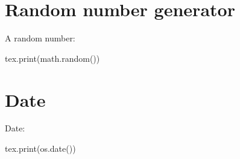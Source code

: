 \documentclass{article}
\begin{document}
\section*{Random number generator}

A random number:
\begin{luacode}
tex.print(math.random())
\end{luacode}

\section*{Date}

Date:
\begin{luacode}
tex.print(os.date())
\end{luacode}
\end{document}

